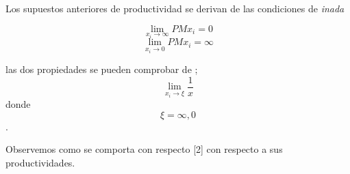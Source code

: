 \documentclass[12pt,a4paper,  titlepage]{article}
\begin{document}
Los supuestos anteriores de productividad se derivan de las condiciones de \textit{inada}

$$\lim_{x_i\longrightarrow \infty}PMx_i=0$$
$$\lim_{x_i\longrightarrow 0}PMx_i=\infty$$

\newpage
las dos propiedades se pueden comprobar de ;
$$\lim_{x_i\longrightarrow \xi}\frac{1}{x}$$ donde $$ {\xi=\infty, 0}$$.



Observemos como se comporta con respecto [2] con respecto a sus productividades.
\end{document}
